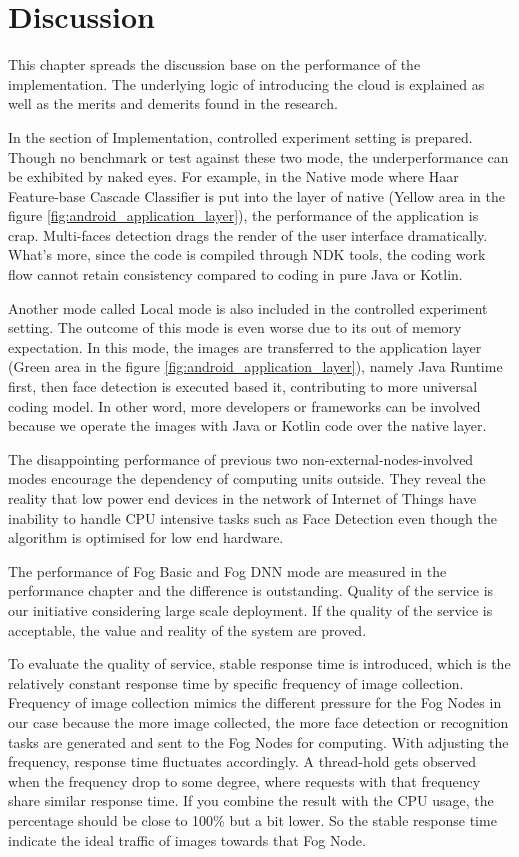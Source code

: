 \chapter{Discussion} \label{chap:discussion}
This chapter spreads the discussion base on the performance of the implementation. The underlying logic of introducing the cloud is explained as well as the merits and demerits found in the research.

In the section of Implementation, controlled experiment setting is prepared. Though no benchmark or test against these two mode, the underperformance can be exhibited by naked eyes. For example, in the Native mode where Haar Feature-base Cascade Classifier is put into the layer of native (Yellow area in the figure \ref{fig:android_application_layer}), the performance of the application is crap. Multi-faces detection drags the render of the user interface dramatically. What's more, since the code is compiled through NDK tools, the coding work flow cannot retain consistency compared to coding in pure Java or Kotlin.

Another mode called Local mode is also included in the controlled experiment setting. The outcome of this mode is even worse due to its out of memory expectation. In this mode, the images are transferred to the application layer (Green area in the figure \ref{fig:android_application_layer}), namely Java Runtime first, then face detection is executed based it, contributing to more universal coding model. In other word, more developers or frameworks can be involved because we operate the images with Java or Kotlin code over the native layer.

The disappointing performance of previous two non-external-nodes-involved modes encourage the dependency of computing units outside. They reveal the reality that low power end devices in the network of Internet of Things have inability to handle CPU intensive tasks such as Face Detection even though the algorithm is optimised for low end hardware.

The performance of Fog Basic and Fog DNN mode are measured in the performance chapter and the difference is outstanding. Quality of the service is our initiative considering large scale deployment. If the quality of the service is acceptable, the value and reality of the system are proved.

To evaluate the quality of service, stable response time is introduced, which is the relatively constant response time by specific frequency of image collection. Frequency of image collection mimics the different pressure for the Fog Nodes in our case because the more image collected, the more face detection or recognition tasks are generated and sent to the Fog Nodes for computing. With adjusting the frequency, response time fluctuates accordingly. A thread-hold gets observed when the frequency drop to some degree, where requests with that frequency share similar response time. If you combine the result with the CPU usage, the percentage should be close to 100\% but a bit lower. So the stable response time indicate the ideal traffic of images towards that Fog Node.

